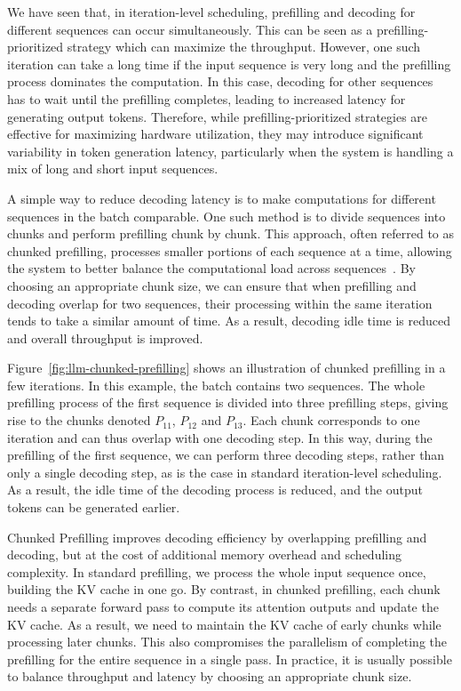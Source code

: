 We have seen that, in iteration-level scheduling, prefilling and decoding for different sequences can occur simultaneously. This can be seen as a prefilling-prioritized strategy which can maximize the throughput. However, one such iteration can take a long time if the input sequence is very long and the prefilling process dominates the computation. In this case, decoding for other sequences has to wait until the prefilling completes, leading to increased latency for generating output tokens. Therefore, while prefilling-prioritized strategies are effective for maximizing hardware utilization, they may introduce significant variability in token generation latency, particularly when the system is handling a mix of long and short input sequences.

A simple way to reduce decoding latency is to make computations for different sequences in the batch comparable. One such method is to divide sequences into chunks and perform prefilling chunk by chunk. This approach, often referred to as chunked prefilling, processes smaller portions of each sequence at a time, allowing the system to better balance the computational load across sequences~\cite{agrawal-etal:2023sarathi}. By choosing an appropriate chunk size, we can ensure that when prefilling and decoding overlap for two sequences, their processing within the same iteration tends to take a similar amount of time. As a result, decoding idle time is reduced and overall throughput is improved.

Figure~\ref{fig:llm-chunked-prefilling} shows an illustration of chunked prefilling in a few iterations. In this example, the batch contains two sequences. The whole prefilling process of the first sequence is divided into three prefilling steps, giving rise to the chunks denoted $P_{11}$, $P_{12}$ and $P_{13}$. Each chunk corresponds to one iteration and can thus overlap with one decoding step. In this way, during the prefilling of the first sequence, we can perform three decoding steps, rather than only a single decoding step, as is the case in standard iteration-level scheduling. As a result, the idle time of the decoding process is reduced, and the output tokens can be generated earlier.

Chunked Prefilling improves decoding efficiency by overlapping prefilling and decoding, but at the cost of additional memory overhead and scheduling complexity. In standard prefilling, we process the whole input sequence once, building the KV cache in one go. By contrast, in chunked prefilling, each chunk needs a separate forward pass to compute its attention outputs and update the KV cache. As a result, we need to maintain the KV cache of early chunks while processing later chunks. This also compromises the parallelism of completing the prefilling for the entire sequence in a single pass. In practice, it is usually possible to balance throughput and latency by choosing an appropriate chunk size.


